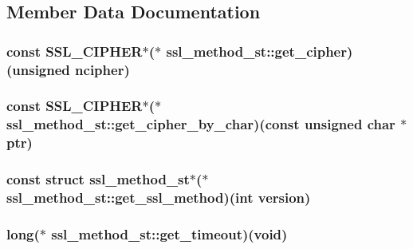 \subsection{Member Data Documentation}
\hypertarget{structssl__method__st_a4ff7b9c1ea43e3b94ad40e7ad9ff80f2}{
\subsubsection[{get\-\_\-cipher}]{\setlength{\rightskip}{0pt plus 5cm}const {\bf S\-S\-L\-\_\-\-C\-I\-P\-H\-E\-R}$\ast$($\ast$ ssl\-\_\-method\-\_\-st\-::get\-\_\-cipher)(unsigned ncipher)}}\label{structssl__method__st_a4ff7b9c1ea43e3b94ad40e7ad9ff80f2}
\hypertarget{structssl__method__st_a7f33bc7f66f8af52e626c154be7795f7}{
\subsubsection[{get\-\_\-cipher\-\_\-by\-\_\-char}]{\setlength{\rightskip}{0pt plus 5cm}const {\bf S\-S\-L\-\_\-\-C\-I\-P\-H\-E\-R}$\ast$($\ast$ ssl\-\_\-method\-\_\-st\-::get\-\_\-cipher\-\_\-by\-\_\-char)(const unsigned char $\ast$ptr)}}\label{structssl__method__st_a7f33bc7f66f8af52e626c154be7795f7}
\hypertarget{structssl__method__st_a3e4b5518d74dea04f3a834af9c49dbe6}{
\subsubsection[{get\-\_\-ssl\-\_\-method}]{\setlength{\rightskip}{0pt plus 5cm}const struct {\bf ssl\-\_\-method\-\_\-st}$\ast$($\ast$ ssl\-\_\-method\-\_\-st\-::get\-\_\-ssl\-\_\-method)(int {\bf version})}}\label{structssl__method__st_a3e4b5518d74dea04f3a834af9c49dbe6}
\hypertarget{structssl__method__st_a448e415d96e9b0a5f5f3d49e50eb9aa4}{
\subsubsection[{get\-\_\-timeout}]{\setlength{\rightskip}{0pt plus 5cm}long($\ast$ ssl\-\_\-method\-\_\-st\-::get\-\_\-timeout)(void)}}\label{structssl__method__st_a448e415d96e9b0a5f5f3d49e50eb9aa4}
